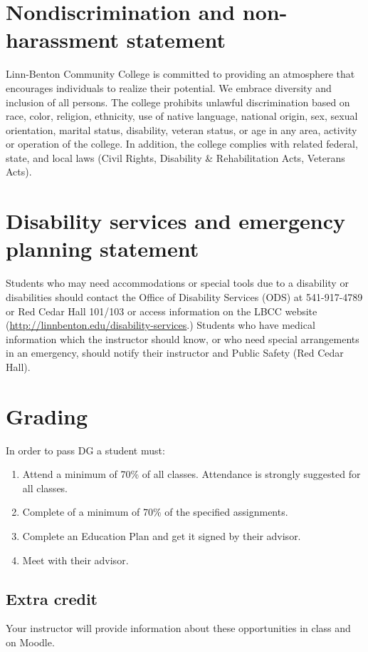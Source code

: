 \documentclass[12pt,article,oneside]{memoir}
\begin{document}
\section{Nondiscrimination and non-harassment statement}

Linn-Benton Community College is committed to providing an atmosphere that  encourages individuals to realize their potential. We embrace diversity and inclusion of all persons. The college prohibits unlawful discrimination based on race, color, religion, ethnicity, use of native language, national origin, sex, sexual orientation, marital status, disability, veteran status, or age in any area, activity or operation of the college. In addition, the college complies with related federal, state, and local laws (Civil Rights, Disability \& Rehabilitation Acts, Veterans Acts).

\section{Disability services and emergency planning statement}

Students who may need accommodations or special tools due to a disability or disabilities should contact the Office of Disability Services (ODS) at 541-917-4789 or Red Cedar Hall 101/103 or access information on the LBCC website (\url{http://linnbenton.edu/disability-services}.) Students who have medical information which the instructor should know, or who need special arrangements in an emergency, should notify their instructor and Public Safety (Red Cedar Hall).

\section{Grading}

In order to pass DG a student must:

\begin{enumerate}
 \item Attend a minimum of 70\% of all classes.  Attendance is strongly suggested for all classes.
 \item Complete of a minimum of 70\% of the specified assignments.
 \item Complete an Education Plan and get it signed by their advisor.
 \item Meet with their advisor.
\end{enumerate}
  

\subsection{Extra credit}
Your instructor will provide information about these opportunities in class and on Moodle.
\end{document}
